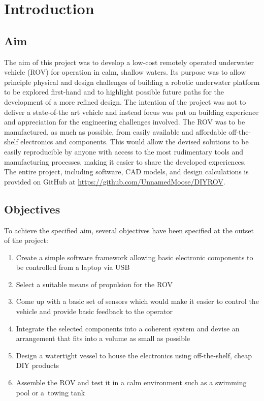 \pagestyle{chapter-fancy-style}
\chapter{Introduction}

\section{Aim}

The aim of this project was to develop a low-cost remotely operated underwater vehicle (ROV)
for operation in calm, shallow waters.
Its purpose was to allow principle physical and design challenges of building a robotic
underwater platform to be explored first-hand and to highlight possible future paths
for the development of a more refined design.
The intention of the project was not to deliver a state-of-the art vehicle and instead
focus was put on building experience and appreciation for the engineering challenges involved.
The ROV was to be manufactured, as much as possible, from easily available and affordable
off-the-shelf electronics and components. This would allow the devised solutions to
be easily reproducible by anyone with access to the most rudimentary tools and manufacturing
processes, making it easier to share the developed experiences.
The entire project, including software, CAD models, and design calculations is provided
on GitHub at \textcolor{blue}{\url{https://github.com/UnnamedMoose/DIYROV}}.

\section{Objectives}

To achieve the specified aim, several objectives have been specified at the outset
of the project:

\begin{enumerate}
\item Create a simple software framework allowing basic electronic components to be controlled from
	a laptop via USB
\item Select a suitable means of propulsion for the ROV
\item Come up with a basic set of sensors which would make it easier to control the vehicle
	and provide basic feedback to the operator
\item Integrate the selected components into a coherent system and devise an arrangement that
	fits into a volume as small as possible
\item Design a watertight vessel to house the electronics using off-the-shelf, cheap DIY products
\item Assemble the ROV and test it in a calm environment such as a swimming pool or a~towing tank
\end{enumerate}

